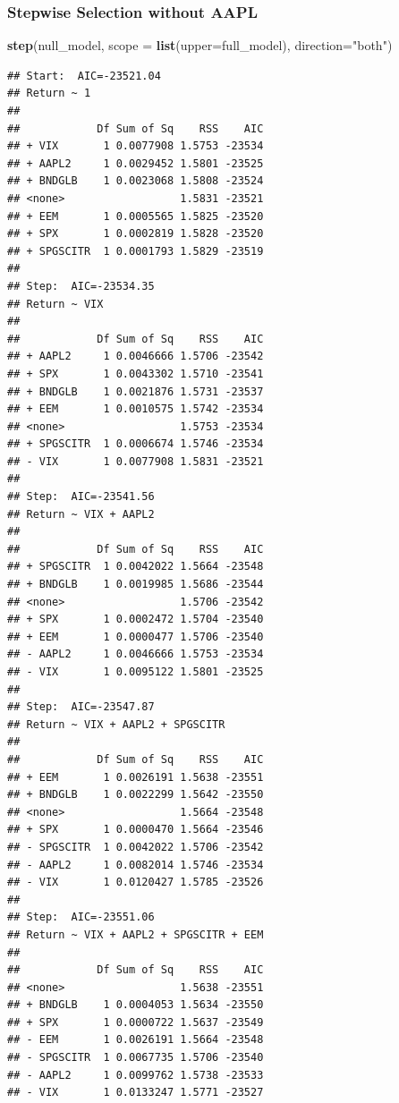 \documentclass[]{article}
\newenvironment{Shaded}{\begin{snugshade}}{\end{snugshade}}
\newcommand{\KeywordTok}[1]{\textcolor[rgb]{0.13,0.29,0.53}{\textbf{#1}}}
\newcommand{\DataTypeTok}[1]{\textcolor[rgb]{0.13,0.29,0.53}{#1}}
\newcommand{\StringTok}[1]{\textcolor[rgb]{0.31,0.60,0.02}{#1}}
\newcommand{\NormalTok}[1]{#1}
\begin{document}
\subsubsection{Stepwise Selection without
AAPL}\label{stepwise-selection-without-aapl}

\begin{Shaded}
\begin{Highlighting}[]
\KeywordTok{step}\NormalTok{(null_model, }\DataTypeTok{scope =} \KeywordTok{list}\NormalTok{(}\DataTypeTok{upper=}\NormalTok{full_model), }\DataTypeTok{direction=}\StringTok{"both"}\NormalTok{)}
\end{Highlighting}
\end{Shaded}

\begin{verbatim}
## Start:  AIC=-23521.04
## Return ~ 1
## 
##            Df Sum of Sq    RSS    AIC
## + VIX       1 0.0077908 1.5753 -23534
## + AAPL2     1 0.0029452 1.5801 -23525
## + BNDGLB    1 0.0023068 1.5808 -23524
## <none>                  1.5831 -23521
## + EEM       1 0.0005565 1.5825 -23520
## + SPX       1 0.0002819 1.5828 -23520
## + SPGSCITR  1 0.0001793 1.5829 -23519
## 
## Step:  AIC=-23534.35
## Return ~ VIX
## 
##            Df Sum of Sq    RSS    AIC
## + AAPL2     1 0.0046666 1.5706 -23542
## + SPX       1 0.0043302 1.5710 -23541
## + BNDGLB    1 0.0021876 1.5731 -23537
## + EEM       1 0.0010575 1.5742 -23534
## <none>                  1.5753 -23534
## + SPGSCITR  1 0.0006674 1.5746 -23534
## - VIX       1 0.0077908 1.5831 -23521
## 
## Step:  AIC=-23541.56
## Return ~ VIX + AAPL2
## 
##            Df Sum of Sq    RSS    AIC
## + SPGSCITR  1 0.0042022 1.5664 -23548
## + BNDGLB    1 0.0019985 1.5686 -23544
## <none>                  1.5706 -23542
## + SPX       1 0.0002472 1.5704 -23540
## + EEM       1 0.0000477 1.5706 -23540
## - AAPL2     1 0.0046666 1.5753 -23534
## - VIX       1 0.0095122 1.5801 -23525
## 
## Step:  AIC=-23547.87
## Return ~ VIX + AAPL2 + SPGSCITR
## 
##            Df Sum of Sq    RSS    AIC
## + EEM       1 0.0026191 1.5638 -23551
## + BNDGLB    1 0.0022299 1.5642 -23550
## <none>                  1.5664 -23548
## + SPX       1 0.0000470 1.5664 -23546
## - SPGSCITR  1 0.0042022 1.5706 -23542
## - AAPL2     1 0.0082014 1.5746 -23534
## - VIX       1 0.0120427 1.5785 -23526
## 
## Step:  AIC=-23551.06
## Return ~ VIX + AAPL2 + SPGSCITR + EEM
## 
##            Df Sum of Sq    RSS    AIC
## <none>                  1.5638 -23551
## + BNDGLB    1 0.0004053 1.5634 -23550
## + SPX       1 0.0000722 1.5637 -23549
## - EEM       1 0.0026191 1.5664 -23548
## - SPGSCITR  1 0.0067735 1.5706 -23540
## - AAPL2     1 0.0099762 1.5738 -23533
## - VIX       1 0.0133247 1.5771 -23527
\end{verbatim}
\end{document}
